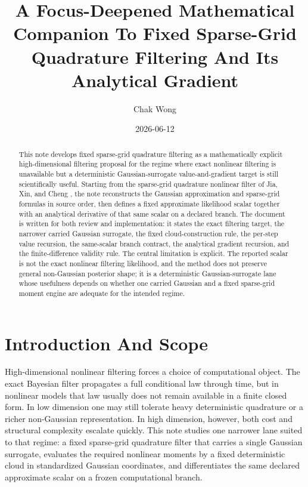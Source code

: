 \documentclass[11pt]{article}
\title{A Focus-Deepened Mathematical Companion To Fixed Sparse-Grid Quadrature Filtering And Its Analytical Gradient}
\author{Chak Wong}
\date{2026-06-12}
\numberwithin{equation}{section}
\begin{document}
\maketitle

\begin{abstract}
This note develops fixed sparse-grid quadrature filtering as a
mathematically explicit high-dimensional filtering proposal for the regime where
exact nonlinear filtering is unavailable but a deterministic Gaussian-surrogate
value-and-gradient target is still scientifically useful.  Starting from the
sparse-grid quadrature nonlinear filter of Jia, Xin, and Cheng
\cite{jia2012sparsegrid}, the note reconstructs the Gaussian approximation and
sparse-grid formulas in source order, then defines a fixed approximate
likelihood scalar together with an analytical derivative of that same scalar on
a declared branch.  The document is written for both review and implementation:
it states the exact filtering target, the narrower carried Gaussian surrogate,
the fixed cloud-construction rule, the per-step value recursion, the
same-scalar branch contract, the analytical gradient recursion, and the
finite-difference validity rule.  The central limitation is explicit.  The
reported scalar is not the exact nonlinear filtering likelihood, and the method
does not preserve general non-Gaussian posterior shape; it is a deterministic
Gaussian-surrogate lane whose usefulness depends on whether one carried Gaussian
and a fixed sparse-grid moment engine are adequate for the intended regime.
\end{abstract}

\section{Introduction And Scope}
\label{sec:p33-reader-orientation}

High-dimensional nonlinear filtering forces a choice of computational object.
The exact Bayesian filter propagates a full conditional law through time, but in
nonlinear models that law usually does not remain available in a finite closed
form.  In low dimension one may still tolerate heavy deterministic quadrature or
a richer non-Gaussian representation.  In high dimension, however, both cost and
structural complexity escalate quickly.  This note studies one narrower lane
suited to that regime: a fixed sparse-grid quadrature filter that carries a
single Gaussian surrogate, evaluates the required nonlinear moments by a fixed
deterministic cloud in standardized Gaussian coordinates, and differentiates the
same declared approximate scalar on a frozen computational branch.
\end{document}
